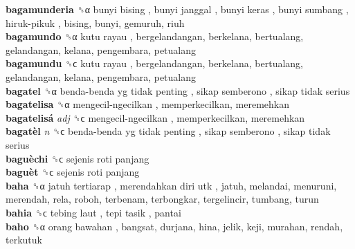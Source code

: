 \textbf{bagamunderia} ␝α   bunyi bising ,  bunyi janggal ,  bunyi keras ,  bunyi sumbang ,  hiruk-pikuk , bising, bunyi, gemuruh, riuh  \\
\textbf{bagamundo} ␝α   kutu rayau , bergelandangan, berkelana, bertualang, gelandangan, kelana, pengembara, petualang  \\
\textbf{bagamundu} ␝ϲ   kutu rayau , bergelandangan, berkelana, bertualang, gelandangan, kelana, pengembara, petualang  \\
\textbf{bagatel} ␝α   benda-benda yg tidak penting ,  sikap semberono ,  sikap tidak serius   \\
\textbf{bagatelisa} ␝α   mengecil-ngecilkan , memperkecilkan, meremehkan  \\
\textbf{bagatelisá} \emph{adj}  ␝ϲ   mengecil-ngecilkan , memperkecilkan, meremehkan  \\
\textbf{bagatèl} \emph{n}  ␝ϲ   benda-benda yg tidak penting ,  sikap semberono ,  sikap tidak serius   \\
\textbf{baguèchi} ␝ϲ   sejenis roti panjang   \\
\textbf{baguèt} ␝ϲ   sejenis roti panjang   \\
\textbf{baha} ␝α   jatuh tertiarap ,  merendahkan diri utk , jatuh, melandai, menuruni, merendah, rela, roboh, terbenam, terbongkar, tergelincir, tumbang, turun  \\
\textbf{bahia} ␝ϲ   tebing laut ,  tepi tasik , pantai  \\
\textbf{baho} ␝α   orang bawahan , bangsat, durjana, hina, jelik, keji, murahan, rendah, terkutuk  \\

